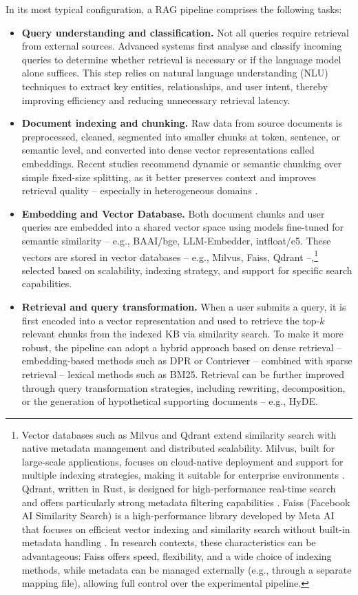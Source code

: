 \begin{spacing}{1.5}
In its most typical configuration, a RAG pipeline comprises the following tasks:
\begin{itemize}
  \item \textbf{Query understanding and classification.} Not all queries require retrieval from external sources. Advanced systems first analyse and classify incoming queries to determine whether retrieval is necessary or if the language model alone suffices. This step relies on natural language understanding (NLU) techniques to extract key entities, relationships, and user intent, thereby improving efficiency and reducing unnecessary retrieval latency.
    \item \textbf{Document indexing and chunking.} Raw data from source documents is preprocessed, cleaned, segmented into smaller chunks at token, sentence, or semantic level, and converted into dense vector representations called embeddings. Recent studies recommend dynamic or semantic chunking over simple fixed-size splitting, as it better preserves context and improves retrieval quality -- especially in heterogeneous domains \citep{gao_precise_2022}.
    \item \textbf{Embedding and Vector Database.} Both document chunks and user queries are embedded into a shared vector space using models fine-tuned for semantic similarity -- e.g., BAAI/bge, LLM-Embedder, intfloat/e5. These vectors are stored in vector databases -- e.g., Milvus, Faiss, Qdrant --,\footnote{Vector databases such as Milvus and Qdrant extend similarity search with native metadata management and distributed scalability. Milvus, built for large-scale applications, focuses on cloud-native deployment and support for multiple indexing strategies, making it suitable for enterprise environments \parencite{2021milvus,2022manu}. Qdrant, written in Rust, is designed for high-performance real-time search and offers particularly strong metadata filtering capabilities \citep{qdrant_github_nodate}. Faiss (Facebook AI Similarity Search)  is a high-performance library developed by Meta AI that focuses on efficient vector indexing and similarity search without built-in metadata handling \citep{douze2024faiss}. In research contexts, these characteristics can be advantageous: Faiss offers speed, flexibility, and a wide choice of indexing methods, while metadata can be managed externally (e.g., through a separate mapping file), allowing full control over the experimental pipeline.} selected based on scalability, indexing strategy, and support for specific search capabilities.
    \item \textbf{Retrieval and query transformation.} When a user submits a query, it is first encoded into a vector representation and used to retrieve the top-$k$ relevant chunks from the indexed KB via similarity search. To make it more robust, the pipeline can adopt a hybrid approach based on dense retrieval -- embedding-based methods such as DPR or Contriever -- combined with sparse retrieval -- lexical methods such as BM25. Retrieval can be further improved through query transformation strategies, including rewriting, decomposition, or the generation of hypothetical supporting documents -- e.g., HyDE.

\end{itemize}
\end{spacing}
